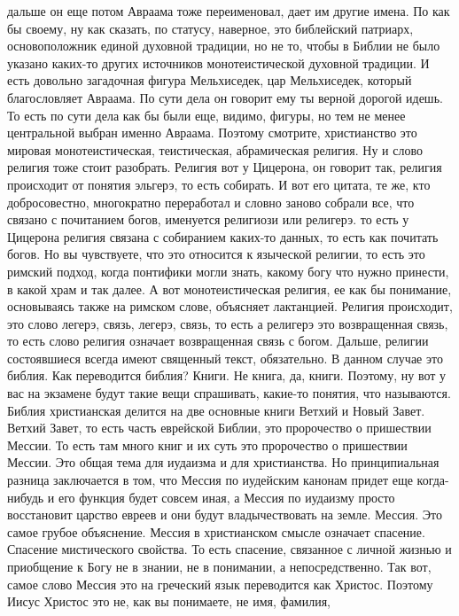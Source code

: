дальше он еще потом Авраама тоже переименовал, дает им другие имена. По как бы
своему, ну как сказать, по статусу, наверное, это библейский патриарх,
основоположник единой духовной традиции, но не то, чтобы в Библии не было
указано каких-то других источников монотеистической духовной традиции. И есть
довольно загадочная фигура Мельхиседек, цар Мельхиседек, который благословляет
Авраама. По сути дела он говорит ему ты верной дорогой идешь. То есть по сути
дела как бы были еще, видимо, фигуры, но тем не менее центральной выбран именно
Авраама. Поэтому смотрите, христианство это мировая монотеистическая,
теистическая, абрамическая религия. Ну и слово религия тоже стоит разобрать.
Религия вот у Цицерона, он говорит так, религия происходит от понятия эльгерэ,
то есть собирать. И вот его цитата, те же, кто добросовестно, многократно
переработал и словно заново собрали все, что связано с почитанием богов,
именуется религиози или религерэ. то есть у Цицерона религия связана с
собиранием каких-то данных, то есть как почитать богов. Но вы чувствуете, что
это относится к языческой религии, то есть это римский подход, когда понтифики
могли знать, какому богу что нужно принести, в какой храм и так далее. А вот
монотеистическая религия, ее как бы понимание, основываясь также на римском
слове, объясняет лактанцией. Религия происходит, это слово легерэ, связь,
легерэ, связь, то есть а религерэ это возвращенная связь, то есть слово религия
означает возвращенная связь с богом. Дальше, религии состоявшиеся всегда имеют
священный текст, обязательно. В данном случае это библия. Как переводится
библия? Книги. Не книга, да, книги. Поэтому, ну вот у вас на экзамене будут
такие вещи спрашивать, какие-то понятия, что называются. Библия христианская
делится на две основные книги Ветхий и Новый Завет. Ветхий Завет, то есть часть
еврейской Библии, это пророчество о пришествии Мессии. То есть там много книг и
их суть это пророчество о пришествии Мессии. Это общая тема для иудаизма и для
христианства. Но принципиальная разница заключается в том, что Мессия по
иудейским канонам придет еще когда-нибудь и его функция будет совсем иная, а
Мессия по иудаизму просто восстановит царство евреев и они будут владычествовать
на земле. Мессия. Это самое грубое объяснение. Мессия в христианском смысле
означает спасение. Спасение мистического свойства. То есть спасение, связанное с
личной жизнью и приобщение к Богу не в знании, не в понимании, а
непосредственно. Так вот, самое слово Мессия это на греческий язык переводится
как Христос. Поэтому Иисус Христос это не, как вы понимаете, не имя, фамилия,

